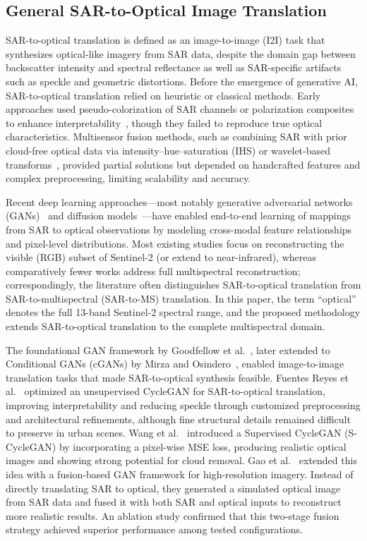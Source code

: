 \subsection{General SAR-to-Optical Image Translation}
SAR-to-optical translation is defined as an image-to-image (I2I) task that synthesizes optical-like imagery from SAR data, despite the domain gap between backscatter intensity and spectral reflectance as well as SAR-specific artifacts such as speckle and geometric distortions. Before the emergence of generative AI, SAR-to-optical translation relied on heuristic or classical methods. Early approaches used pseudo-colorization of SAR channels or polarization composites to enhance interpretability~\cite{colorization_Schmitt_2018}, though they failed to reproduce true optical characteristics. Multisensor fusion methods, such as combining SAR with prior cloud-free optical data via intensity–hue–saturation (IHS) or wavelet-based transforms~\cite{IHS_wavelet_Zhang2019}, provided partial solutions but depended on handcrafted features and complex preprocessing, limiting scalability and accuracy.

Recent deep learning approaches—most notably generative adversarial networks (GANs)~\cite{GANs_Goodfellow} and diffusion models~\cite{DDPM_2020}—have enabled end-to-end learning of mappings from SAR to optical observations by modeling cross-modal feature relationships and pixel-level distributions. Most existing studies focus on reconstructing the visible (RGB) subset of Sentinel-2 (or extend to near-infrared), whereas comparatively fewer works address full multispectral reconstruction; correspondingly, the literature often distinguishes SAR-to-optical translation from SAR-to-multispectral (SAR-to-MS) translation. In this paper, the term ``optical'' denotes the full 13-band Sentinel-2 spectral range, and the proposed methodology extends SAR-to-optical translation to the complete multispectral domain.


The foundational GAN framework by Goodfellow et al.~\cite{GANs_Goodfellow}, later extended to Conditional GANs (cGANs) by Mirza and Osindero~\cite{cGANs_mirza}, enabled image-to-image translation tasks that made SAR-to-optical synthesis feasible. Fuentes Reyes et al.~\cite{sar2opt_cGAN_Optim_oppr_limits} optimized an unsupervised CycleGAN for SAR-to-optical translation, improving interpretability and reducing speckle through customized preprocessing and architectural refinements, although fine structural details remained difficult to preserve in urban scenes. Wang et al.~\cite{s2ot_s_cycle_adv} introduced a Supervised CycleGAN (S-CycleGAN) by incorporating a pixel-wise MSE loss, producing realistic optical images and showing strong potential for cloud removal. Gao et al.~\cite{cr_fuse_HR_GEN} extended this idea with a fusion-based GAN framework for high-resolution imagery. Instead of directly translating SAR to optical, they generated a simulated optical image from SAR data and fused it with both SAR and optical inputs to reconstruct more realistic results. An ablation study confirmed that this two-stage fusion strategy achieved superior performance among tested configurations.

